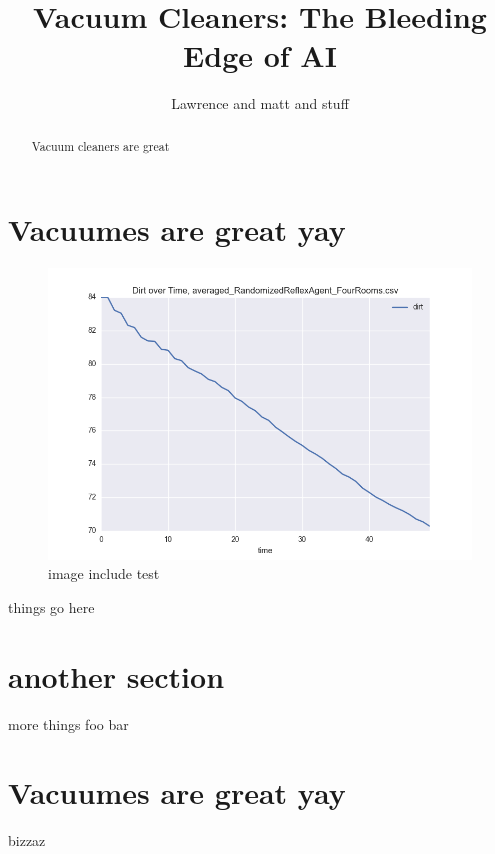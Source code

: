 \documentclass{article} %
\begin{document}
\title{Vacuum Cleaners: The Bleeding Edge of AI}

\author{Lawrence  and matt and stuff}

\newcommand{\fix}{\marginpar{FIX}}
\newcommand{\new}{\marginpar{NEW}}

\iclrfinalcopy %

\maketitle

\begin{abstract}
    Vacuum cleaners are great
\end{abstract}

\section{Vacuumes are great yay}

\begin{figure}[h]
\begin{center}
    \includegraphics[width=\linewidth]{fig_001.png}
\end{center}
\caption{image include test}
\end{figure}

things go here

\section{another section}
more things
foo bar

\section{Vacuumes are great yay}
bizzaz
\end{document}
